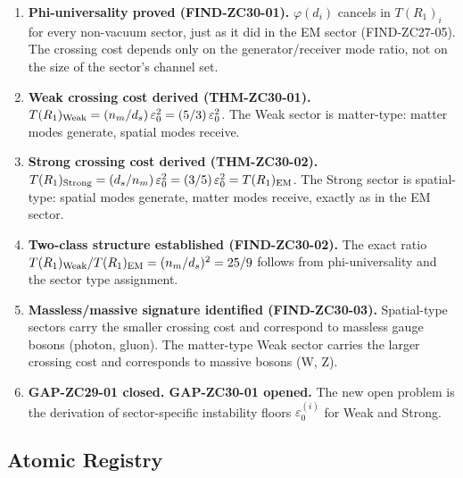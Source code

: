 \documentclass[12pt, a4paper]{article}
\begin{document}
\begin{enumerate}[leftmargin=*, label=\arabic*., noitemsep]

\item \textbf{Phi-universality proved (FIND-ZC30-01).}
$\varphi(d_i)$ cancels in $T(R_1)_i$ for every non-vacuum sector,
just as it did in the EM sector (FIND-ZC27-05).
The crossing cost depends only on the generator/receiver mode
ratio, not on the size of the sector's channel set.

\item \textbf{Weak crossing cost derived (THM-ZC30-01).}
$T(R_1)_{\rm Weak} = (n_m/d_s)\,\varepsilon_0^2 = (5/3)\,\varepsilon_0^2$.
The Weak sector is matter-type:
matter modes generate, spatial modes receive.

\item \textbf{Strong crossing cost derived (THM-ZC30-02).}
$T(R_1)_{\rm Strong} = (d_s/n_m)\,\varepsilon_0^2 = (3/5)\,\varepsilon_0^2
= T(R_1)_{\rm EM}$. The Strong sector is spatial-type:
spatial modes generate, matter modes receive,
exactly as in the EM sector.

\item \textbf{Two-class structure established (FIND-ZC30-02).}
The exact ratio
$T(R_1)_{\rm Weak}/T(R_1)_{\rm EM} = (n_m/d_s)^2 = 25/9$
follows from phi-universality and the sector type assignment.

\item \textbf{Massless/massive signature identified (FIND-ZC30-03).}
Spatial-type sectors carry the smaller crossing cost and correspond
to massless gauge bosons (photon, gluon).
The matter-type Weak sector carries the larger crossing cost and
corresponds to massive bosons (W, Z).

\item \textbf{GAP-ZC29-01 closed. GAP-ZC30-01 opened.}
The new open problem is the derivation of sector-specific
instability floors $\varepsilon_0^{(i)}$ for Weak and Strong.

\end{enumerate}

\subsection{Atomic Registry}
\label{zc30:sec:registry}
\end{document}
